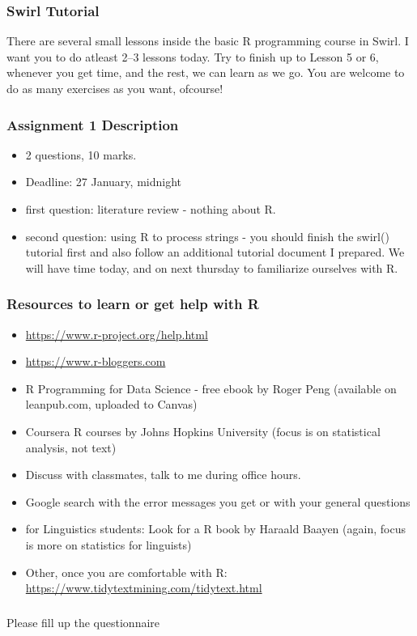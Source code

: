 \documentclass{beamer}
\begin{document}
\begin{frame}
\frametitle{Swirl Tutorial}
There are several small lessons inside the basic R programming course in Swirl. I want you to do atleast 2--3 lessons today. Try to finish up to Lesson 5 or 6, whenever you get time, and the rest, we can learn as we go. You are welcome to do as many exercises as you want, ofcourse! 
\end{frame}

\begin{frame}
\frametitle{Assignment 1 Description}
\begin{itemize}
\item 2 questions, 10 marks. 
\item Deadline: 27 January, midnight
\item first question: literature review - nothing about R.
\item second question: using R to process strings - you should finish the swirl() tutorial first and also follow an additional tutorial document I prepared. We will have time today, and on next thursday to familiarize ourselves with R. 
\end{itemize}
\end{frame}

\begin{frame}
\frametitle{Resources to learn or get help with R}
\begin{itemize}
\item \url{https://www.r-project.org/help.html}
\item \url{https://www.r-bloggers.com}
\item R Programming for Data Science - free ebook by Roger Peng (available on leanpub.com, uploaded to Canvas)
\item Coursera R courses by Johns Hopkins University (focus is on statistical analysis, not text)
\item Discuss with classmates, talk to me during office hours. 
\item Google search with the error messages you get or with your general questions
\item for Linguistics students: Look for a R book by Haraald Baayen (again, focus is more on statistics for linguists)
\item Other, once you are comfortable with R: \url{https://www.tidytextmining.com/tidytext.html}
\end{itemize}
\end{frame}

\begin{frame}
\frametitle{}
\begin{center}
\Large Please fill up the questionnaire
\end{center}
\end{frame}
\end{document}

